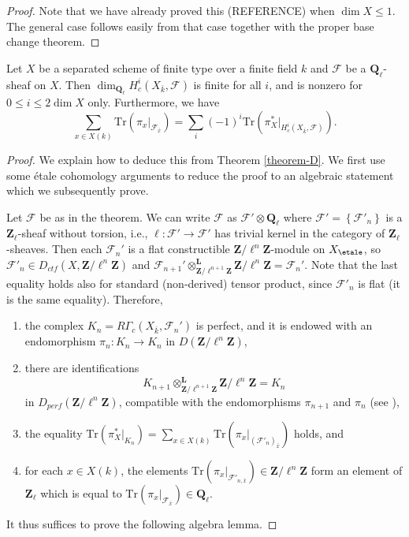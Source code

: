 \begin{proof}
Note that we have already proved this (REFERENCE) when $\dim X \leq 1$. The
general case follows easily from that case together with the proper base change
theorem.
\end{proof}

\begin{theorem}
\label{theorem-C}
Let $X$ be a separated scheme of finite type over a finite field $k$ and
$\mathcal{F}$ be a $\mathbf{Q}_\ell$-sheaf on $X$. Then
$\dim_{\mathbf{Q}_\ell}H_c^i(X_{\bar k}, \mathcal{F})$ is finite for all $i$,
and is nonzero for $0\leq i \leq 2 \dim X$ only. Furthermore, we have
$$
\sum_{x\in X(k)} \text{Tr}\left(\pi_x |_{\mathcal{F}_{\bar x}}\right) =
\sum_i (-1)^i\text{Tr}\left(\pi_X^* |_{H_c^i(X_{\bar k}, \mathcal{F})}\right).
$$
\end{theorem}

\begin{proof}
We explain how to deduce this from Theorem \ref{theorem-D}.
We first use some \'etale cohomology arguments to reduce the proof
to an algebraic statement which we subsequently prove.

\medskip\noindent
Let $\mathcal{F}$ be as in the theorem. We can write
$\mathcal{F}$ as
$\mathcal{F}'\otimes \mathbf{Q}_\ell$ where $\mathcal{F}' =
\left\{\mathcal{F}'_n\right\}$ is a $\mathbf{Z}_\ell$-sheaf without torsion,
i.e., $\ell : \mathcal{F}'\to \mathcal{F}'$ has trivial kernel in the
category of $\mathbf{Z}_\ell$-sheaves. Then each $\mathcal{F}_n'$ is a flat
constructible $\mathbf{Z}/\ell^n\mathbf{Z}$-module on $X_\etale$, so
$\mathcal{F}'_n \in D_{ctf}(X, \mathbf{Z}/\ell^n\mathbf{Z})$ and
$\mathcal{F}_{n+1}'
\otimes^{\mathbf{L}}_{\mathbf{Z}/\ell^{n+1}\mathbf{Z}}
\mathbf{Z}/\ell^n\mathbf{Z} = \mathcal{F}_n'$.
Note that the last equality holds also
for standard (non-derived) tensor product, since $\mathcal{F}'_n$ is flat
(it is the same equality). Therefore,
\begin{enumerate}
\item
the complex $K_n = R\Gamma_c\left(X_{\bar k}, \mathcal{F}_n'\right)$ is perfect,
and it is endowed with an endomorphism $\pi_n : K_n\to K_n$ in
$D(\mathbf{Z}/\ell^n\mathbf{Z})$,
\item
there are identifications
$$
K_{n+1}
\otimes^{\mathbf{L}}_{\mathbf{Z}/\ell^{n+1}\mathbf{Z}}
\mathbf{Z}/\ell^n\mathbf{Z}
=
K_n
$$
in $D_{perf}(\mathbf{Z}/\ell^n\mathbf{Z})$, compatible with the endomorphisms
$\pi_{n+1}$ and $\pi_n$ (see \cite[Rapport 4.12]{SGA4.5}),
\item
the equality $\text{Tr}\left(\pi_X^* |_{K_n}\right) =
\sum_{x\in X(k)} \text{Tr}\left(\pi_x |_{(\mathcal{F}'_n)_{\bar x}}\right)$
holds, and
\item
for each $x\in X(k)$, the elements
$\text{Tr}(\pi_x |_{\mathcal{F}'_{n, \bar x}}) \in \mathbf{Z}/\ell^n\mathbf{Z}$
form an element of
$\mathbf{Z}_\ell$ which is equal to
$\text{Tr}(\pi_x |_{\mathcal{F}_{\bar x}}) \in \mathbf{Q}_\ell$.
\end{enumerate}
It thus suffices to prove the following algebra lemma.
\end{proof}

